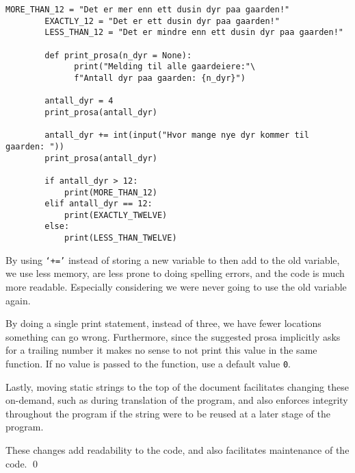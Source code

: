 \documentclass{assignment}
\begin{document}
	\begin{lstlisting}[style=custompython]
		MORE_THAN_12 = "Det er mer enn ett dusin dyr paa gaarden!"
		EXACTLY_12 = "Det er ett dusin dyr paa gaarden!"
		LESS_THAN_12 = "Det er mindre enn ett dusin dyr paa gaarden!"

		def print_prosa(n_dyr = None):
			  print("Melding til alle gaardeiere:"\
			  f"Antall dyr paa gaarden: {n_dyr}")

		antall_dyr = 4
		print_prosa(antall_dyr)

		antall_dyr += int(input("Hvor mange nye dyr kommer til gaarden: "))
		print_prosa(antall_dyr)

		if antall_dyr > 12:
			print(MORE_THAN_12)
		elif antall_dyr == 12:
		 	print(EXACTLY_TWELVE)
		else:
			print(LESS_THAN_TWELVE)
	\end{lstlisting}

By using \texttt{`+='} instead of storing a new variable to then add to the old variable, we use less memory, are less prone to doing spelling errors, and the code is much more readable. Especially considering we were never going to use the old variable again.

By doing a single print statement, instead of three, we have fewer locations something can go wrong. Furthermore, since the suggested prosa implicitly asks for a trailing number it makes no sense to not print this value in the same function. If no value is passed to the function, use a default value \texttt{0}.

Lastly, moving static strings to the top of the document facilitates changing these on-demand, such as during translation of the program, and also enforces integrity throughout the program if the string were to be reused at a later stage of the program.

These changes add readability to the code, and also facilitates maintenance of the code.
\qed
\end{document}
